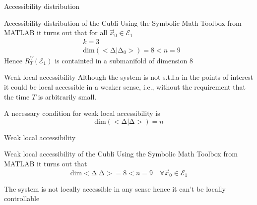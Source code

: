 \begin{frame}{Accessibility distribution \cubli}
  \begin{exampleblock}{Accessibility distribution of the Cubli}
    Using the Symbolic Math Toolbox from MATLAB it turns out that for all $\vec{x}_{0} \in \mathcal{E}_{1}$ 
    \[
    \begin{split}
      &k = 3\\
      &\mathrm{dim}(<\mathrm{\Delta}|\mathrm{\Delta}_0>) = 8 < n = 9
    \end{split}
    \]
    Hence $R_{T}^{V}(\mathcal{E}_{1})$ is containted in a submanifold of dimension $8$
  \end{exampleblock}
\end{frame}

\begin{frame}{Weak local accessibility \theory}
  Although the system is not s.t.l.a in the points of interest it could be local accessible
  in a weaker sense, i.e., without the requirement that the time $T$ is arbitrarily small.
  \begin{theorem}
    A \alert{necessary} condition for weak local accessibility is
    \[
    \mathrm{dim}(<\mathrm{\Delta}|\mathrm{\Delta}>) = n
    \]
  \end{theorem}
\end{frame}

\begin{frame}{Weak local accessibility \cubli}
  \begin{exampleblock}{Weak local accessibility of the Cubli}
    Using the Symbolic Math Toolbox from MATLAB it turns out that
    \[
    \mathrm{dim} <\mathrm{\Delta} | \mathrm{\Delta}> = 8 < n = 9
    \quad \forall \vec{x}_0 \in \mathcal{E}_1
    \]
  \end{exampleblock}
  \alert{The system is not locally accessible in any sense hence it can't be locally controllable}
\end{frame}

